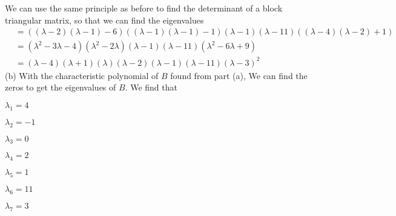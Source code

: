 \documentclass{report}
\begin{document}
We can use the same principle as before to find the determinant of a block triangular matrix,  so that we can find the eigenvalues
\begin{align*}
& = ((\lambda-2)(\lambda-1)-6)((\lambda-1)(\lambda-1)-1)(\lambda-1)(\lambda-11)((\lambda-4)(\lambda-2)+1) \\
& = (\lambda^2 -3\lambda -4)(\lambda^2-2\lambda)(\lambda-1)(\lambda-11)(\lambda^2-6\lambda+9) \\
& = (\lambda-4)(\lambda+1)(\lambda)(\lambda-2)(\lambda-1)(\lambda-11)(\lambda-3)^2
\end{align*}
(b) With the characteristic polynomial of $B$ found from part (a),  We can find the zeros to get the eigenvalues of $B$.  We find that
\begin{itemize}
\begin{minipage}[t]{0.5\textwidth}
\item $\lambda_1=4$
\item $\lambda_2=-1$
\item $\lambda_3=0$
\item $\lambda_4=2$
\end{minipage}
\begin{minipage}[t]{0.5\textwidth}
\item $\lambda_5=1$
\item $\lambda_6=11$
\item $\lambda_7=3$
\end{minipage}
\end{itemize}
\end{document}
